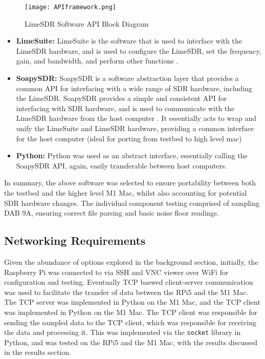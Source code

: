 \begin{figure}[htbp]
    \centering
    \texttt{[image: APIframework.png]}
    \caption{LimeSDR Software API Block Diagram}
    \label{fig:limeSDRapi}
\end{figure}

\begin{itemize}
    \item \textbf{LimeSuite:} LimeSuite is the software that is used to interface with the LimeSDR hardware, and is used to configure the LimeSDR, set the frequency, gain, and bandwidth, and perform other functions \cite{limesdr_usb}. 
    \item \textbf{SoapySDR:} SoapySDR \cite{soapsdr} is a software abstraction layer that provides a common API for interfacing with a wide range of SDR hardware, including the LimeSDR. SoapySDR provides a simple and consistent API for interfacing with SDR hardware, and is used to communicate with the LimeSDR hardware from the host computer \cite{SoapySDR}. It essentially acts to wrap and unify the LimeSuite and LimeSDR hardware, providing a common interface for the host computer (ideal for porting from testbed to high level mac)
    \item \textbf{Python:} Python was used as an abstract interface, essentially calling the SoapySDR API, again, easily transferable between host computers. 
\end{itemize}

In summary, the above software was selected to ensure portability between both the testbed and the higher level M1 Mac, whilst also accounting for potential SDR hardware changes. The individual component testing comprised of sampling DAB 9A, ensuring correct file parsing and basic noise floor readings.

\subsection{Networking Requirements \label{sec:networking}}
Given the abundance of options explored in the background section, initially, the Raspberry Pi was connected to via SSH and VNC viewer over WiFi for configuration and testing. Eventually TCP baswed client-server communication was used to facilitate the transfer of data between the RPi5 and the M1 Mac. The TCP server was implemented in Python on the M1 Mac, and the TCP client was implemented in Python on the M1 Mac. The TCP client was responsible for sending the sampled data to the TCP client, which was responsible for receiving the data and processing it. This was implemented via the \texttt{socket} library in Python, and was tested on the RPi5 and the M1 Mac, with the results discussed in the results section.


